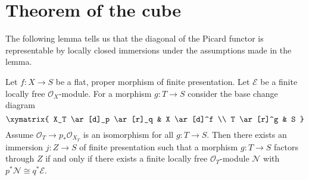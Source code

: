 \section{Theorem of the cube}
\label{section-theorem-cube}

\noindent
The following lemma tells us that the diagonal of the Picard
functor is representable by locally closed immersions under
the assumptions made in the lemma.

\begin{lemma}
\label{lemma-diagonal-picard-flat-proper}
Let $f : X \to S$ be a flat, proper morphism of finite presentation.
Let $\mathcal{E}$ be a finite locally free $\mathcal{O}_X$-module.
For a morphism $g : T \to S$ consider the base change diagram
$$
\xymatrix{
X_T \ar[d]_p \ar[r]_q & X \ar[d]^f \\
T \ar[r]^g & S
}
$$
Assume $\mathcal{O}_T \to p_*\mathcal{O}_{X_T}$ is an
isomorphism for all $g : T \to S$. Then there exists an
immersion $j : Z \to S$ of finite presentation such that
a morphism $g : T \to S$ factors through $Z$ if and only if
there exists a finite locally free $\mathcal{O}_T$-module $\mathcal{N}$
with $p^*\mathcal{N} \cong q^*\mathcal{E}$.
\end{lemma}

